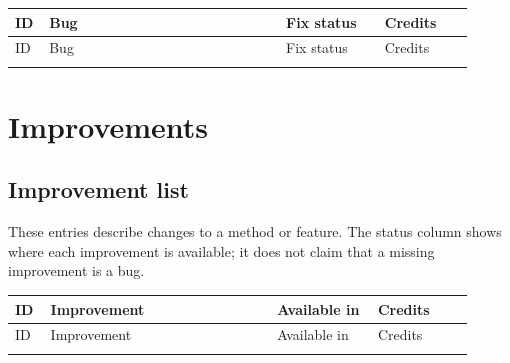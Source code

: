 \documentclass[10pt,a4paper]{article}
\begin{document}
{\small
\setlength{\tabcolsep}{4pt}
\renewcommand{\arraystretch}{1.12}
\begin{longtable}{@{}p{0.05\linewidth}>{\raggedright\arraybackslash}p{0.48\linewidth}p{0.20\linewidth}>{\raggedright\arraybackslash}p{0.18\linewidth}@{}}
\toprule
ID & Bug & Fix status & Credits\\
\midrule
\endfirsthead
\toprule
ID & Bug & Fix status & Credits\\
\midrule
\endhead
\bottomrule
\endfoot

\end{longtable}
}



\section{Improvements}
\subsection*{Improvement list}
These entries describe changes to a method or feature. The status
column shows where each improvement is available; it does not claim
that a missing improvement is a bug.

{\small
\setlength{\tabcolsep}{4pt}
\renewcommand{\arraystretch}{1.12}
\begin{longtable}{@{}p{0.07\linewidth}>{\raggedright\arraybackslash}p{0.45\linewidth}p{0.20\linewidth}>{\raggedright\arraybackslash}p{0.19\linewidth}@{}}
\toprule
ID & Improvement & Available in & Credits\\
\midrule
\endfirsthead
\toprule
ID & Improvement & Available in & Credits\\
\midrule
\endhead
\bottomrule
\endfoot

\end{longtable}
}


\end{document}
